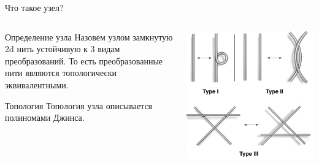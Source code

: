 \begin{frame}{Что такое узел?}

	\begin{columns}

		\begin{column}{0.5\linewidth}
			\begin{block}{Определение узла}
				Назовем узлом замкнутую 2d нить устойчивую к 3 видам преобразований. То есть преобразованные нити являются топологически эквивалентными.
			\end{block}

			\begin{block}{Топология}
				Топология узла описывается полиномами Джинса.
			\end{block}

		\end{column}

		\begin{column}{0.5\linewidth}
			\includegraphics[height=1\linewidth]{img/hnurki_peracii.png}
		\end{column}

	\end{columns}

\end{frame}


